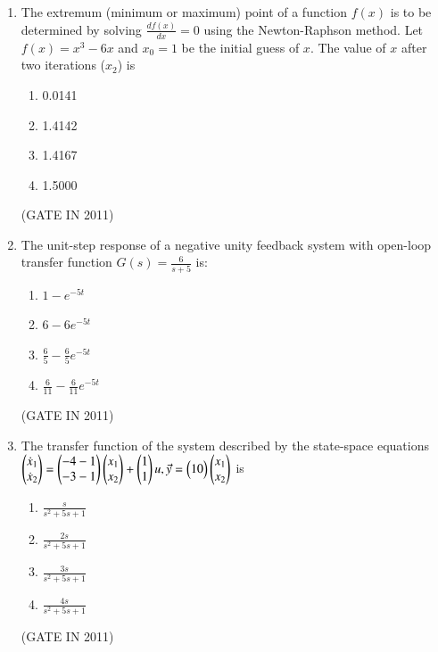 \documentclass[journal]{IEEEtran}
\begin{document}
\begin{enumerate}
\item The extremum (minimum or maximum) point of a function $f(x)$ is to be determined by solving $ \frac{d f(x)}{dx} = 0 $ using the Newton-Raphson method. Let $f(x) = x^3 - 6x$ and $x_0 = 1$ be the initial guess of $x$. The value of $x$ after two iterations ($x_2$) is

\begin{multicols}{4}
\begin{enumerate}
\item 0.0141
\item 1.4142
\item 1.4167
\item 1.5000
\end{enumerate}
\end{multicols} \hfill(GATE IN 2011)

\item The unit-step response of a negative unity feedback system with open-loop transfer function  
$G(s) = \frac{6}{s + 5}$  
is:
\begin{multicols}{4}
\begin{enumerate}
\item $1 - e^{-5t}$  
\item $6 - 6e^{-5t}$  
\item $\frac{6}{5} - \frac{6}{5}e^{-5t}$
\item $\frac{6}{11} - \frac{6}{11}e^{-5t}$
\end{enumerate}
\end{multicols} \hfill(GATE IN 2011)


\item The transfer function of the system described by the state-space equations $ \begin{pmatrix}\dot{x}_1 \\ \dot{x}_2\end{pmatrix}=\begin{pmatrix}-4 -1 \\-3 -1\end{pmatrix}\begin{pmatrix}x_1 \\ x_2\end{pmatrix} +\begin{pmatrix}1 \\ 1\end{pmatrix}u,\Vec{y}=\begin{pmatrix}1 0\end{pmatrix}\begin{pmatrix}x_1 \\ x_2\end{pmatrix}$ 
is 

\begin{multicols}{4}
\begin{enumerate}
\item $\frac{s}{s^2 + 5s + 1}$
\item $\frac{2s}{s^2 + 5s + 1}$
\item $\frac{3s}{s^2 + 5s + 1}$
\item $\frac{4s}{s^2 + 5s + 1}$
\end{enumerate}
\end{multicols} \hfill(GATE IN 2011)



\end{enumerate}
\end{document}
